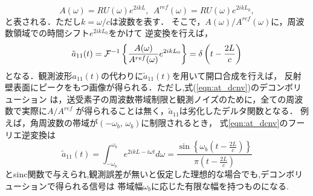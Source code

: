\documentclass[10pt,a4j,dvipdfmx]{jarticle}
\begin{document}
\begin{equation}
	A(\omega) = RU(\omega) e^{2ik L},  \ \
	A^{ref}(\omega) = RU(\omega) e^{2ik L_0}, 
	\label{eqn:}
\end{equation}
と表される．ただし$k=\omega/c$は波数を表す．
そこで，$A(\omega)/A^{ref}(\omega)$に，周波数領域での時間シフト$e^{2ikL_0}$をかけて
逆変換を行えば，
\begin{equation}
	\tilde a_{11}(t)= {\cal F}^{-1} \left\{ 
	\frac{A(\omega)}{A^{ref}(\omega)} e ^{2ik L_0}
	\right\}
	=\delta \left(t-\frac{2L}{c}\right)
	\label{eqn:at_dcnv}
\end{equation}
となる．観測波形$a_{11}(t)$の代わりに$\tilde a_{11}(t)$を用いて開口合成を行えば，
反射壁表面にピークをもつ画像が得られる．ただし,式(\ref{eqn:at_dcnv})のデコンボリューション
は，送受素子の周波数帯域制限と観測ノイズのために，全ての周波数で実際に$A/A^{ref}$
が得られることは無く，$\tilde a_{11}$は劣化したデルタ関数となる．
例えば，角周波数の帯域が$(-\omega_b,\, \omega_b)$に制限されるとき，
式\ref{eqn:at_dcnv}のフーリエ逆変換は
\begin{equation}
	\tilde a_{11}(t)= 
	\int_{-\omega_b}^{\omega_b} 
	e^{2ikL-i\omega t} d\omega 
	=\frac{\sin\left\{ \omega_b \left( t-\frac{2L}{c}\right)\right\}}{\pi \left(t-\frac{2L}{c}\right)}
	\label{eqn:}
\end{equation}
とsinc関数で与えられ,観測誤差が無いと仮定した理想的な場合でも,デコンボリューションで得られる信号は
帯域幅$\omega_b$に応じた有限な幅を持つものになる.
\end{document}
